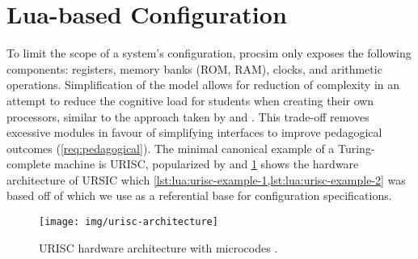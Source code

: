 

\section{Lua-based Configuration}

To limit the scope of a system's configuration, procsim only exposes the following components: registers, memory banks (ROM, RAM), clocks, and arithmetic operations. Simplification of the model allows for reduction of complexity in an attempt to reduce the cognitive load for students when creating their own processors, similar to the approach taken by \cite{Skrien2001} and \cite{Garcia2009}. This trade-off removes excessive modules in favour of simplifying interfaces to improve pedagogical outcomes (\cref{req:pedagogical}). The minimal canonical example of a Turing-complete machine is URISC, popularized by \cite{Mavaddat1988} and \cref{fig:urisc-architecture} shows the hardware architecture of URSIC which \cref{lst:lua:urisc-example-1,lst:lua:urisc-example-2} was based off of which we use as a referential base for configuration specifications.

\begin{figure}[bp!]
    \centering
    \texttt{[image: img/urisc-architecture]}
    \caption{URISC hardware architecture with microcodes \cite{Mavaddat1988}.}
    \label{fig:urisc-architecture}
\end{figure}

\begin{listing}[hp!]
    \inputminted[escapeinside=||, lastline=42]{lua}{./listings/urisc.lua}
    \caption{Configuration of \cref{fig:urisc-architecture} for the URISC processor \cite{Mavaddat1988}.}
    \label{lst:lua:urisc-example-1}
\end{listing}

\begin{listing*}[hp!]
    \inputminted[escapeinside=||, firstline=43]{lua}{./listings/urisc.lua}
    \caption{(Continued) Configuration of \cref{fig:urisc-architecture} for the URISC processor \cite{Mavaddat1988}.}
    \label{lst:lua:urisc-example-2}
\end{listing*}

